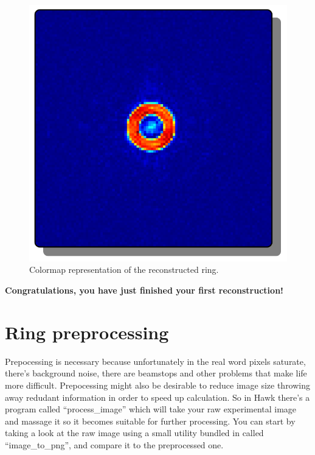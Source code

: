 \documentclass{report}
\begin{document}
\begin{figure}[htp]
\centering
\includegraphics[scale=0.5]{reconstructed_ring.png}
\caption{Colormap representation of the reconstructed ring.}
\label{reconstructed-ring}
\end{figure}

{\bf Congratulations, you have just finished your first reconstruction!}



\section{Ring preprocessing}
\label{tutorial-ring-preprocessing}

Prepocessing is necessary because unfortunately in the real word pixels saturate, there's background noise, 
there are beamstops and other problems that make life more difficult. Prepocessing might also be desirable
to reduce image size throwing away redudant information in order to speed up calculation.
So in Hawk there's a program called
``process\_image'' which will take your raw experimental image and massage it so it becomes suitable for further 
processing. You can start by taking a look at the raw image using a small utility bundled in called ``image\_to\_png'',
and compare it to the preprocessed one.

\vspace {0.1 in}
\end{document}
